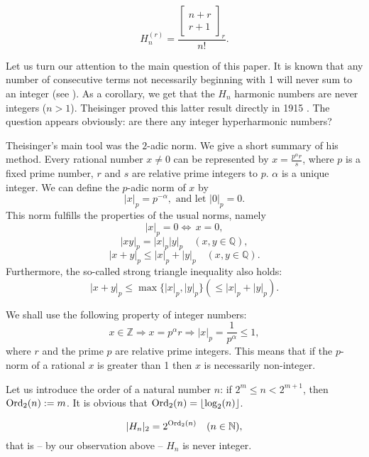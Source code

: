 \documentclass[a4paper,12pt]{amsart}
\begin{document}
\[H_n^{(r)}=\frac{[\begin{smallmatrix}n+r\\r+1\end{smallmatrix}]_r}{n!}.\]

Let us turn our attention to the main question of this paper. It is known that any number of consecutive terms not necessarily beginning with 1 will never sum to an integer (see \cite{MW}). As a corollary, we get that the $H_n$ harmonic numbers are never integers ($n>1$). Theisinger proved this latter result directly in 1915 \cite{T}. The question appears obviously: are there any integer hyperharmonic numbers?

Theisinger's main tool was the $2$-adic norm. We give a short summary of his method.
Every rational number $x\neq 0$ can be represented by $x=\frac{p^\alpha r}{s}$, where $p$ is a fixed prime number, $r$ and $s$ are relative prime integers to $p$. $\alpha$ is a unique integer. We can define the $p$-adic norm of $x$ by
\[|x|_p=p^{-\alpha},\mbox{ and let }|0|_p=0.\]
This norm fulfills the properties of the usual norms, namely
\[|x|_p=0\Longleftrightarrow\,x=0,\]
\[|xy|_p=|x|_p|y|_p\quad(x,y\in{\mathbb{Q}}),\]
\[|x+y|_p\le|x|_p+|y|_p\quad(x,y\in{\mathbb{Q}}).\]
Furthermore, the so-called strong triangle inequality also holds:
\[|x+y|_p\le\max\{|x|_p,|y|_p\}(\le|x|_p+|y|_p).\]

We shall use the following property of integer numbers:
\[x\in{\mathbb{Z}}\Longrightarrow x=p^\alpha r\Longrightarrow|x|_p=\frac{1}{p^\alpha}\le 1,\]
where $r$ and the prime $p$ are relative prime integers. This means that if the $p$-norm of a rational $x$ is greater than 1 then $x$ is necessarily non-integer.

Let us introduce the order of a natural number $n$: if $2^m\le n<2^{m+1}$, then ${\mathop{\textup{Ord}}\nolimits}_2(n):=m$.
It is obvious that ${\mathop{\textup{Ord}}\nolimits}_2(n)=\left\lfloor\log_2(n)\right\rfloor$.

\begin{Theorem}
\[|H_n|_2=2^{{\mathop{\textup{Ord}}\nolimits}_2(n)}\quad(n\in{\mathbb{N}}),\]
that is -- by our observation above -- $H_n$ is never integer.
\end{Theorem}
\end{document}
